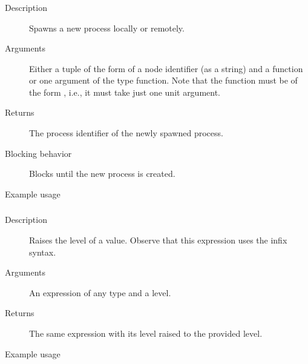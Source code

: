 \subsubsection{}
\begin{description}
    \item [Description] Spawns a new process locally or remotely.
    \item [Arguments] Either a tuple of the form  of a node identifier (as a string) and a function
or one argument of the type function.
Note that the function must be of the form , i.e., it must take just one unit argument.
    \item [Returns] The process identifier of the newly spawned process.
    \item [Blocking behavior] Blocks until the new process is created.
    \item [Example usage] 

\end{description}


\subsubsection{}
\begin{description}
    \item [Description] Raises the level of a value. Observe that this expression uses the infix syntax.
    \item [Arguments] An expression of any type and a level.
    \item [Returns] The same expression with its level raised to the provided level.
    \item [Example usage] 
\end{description}


